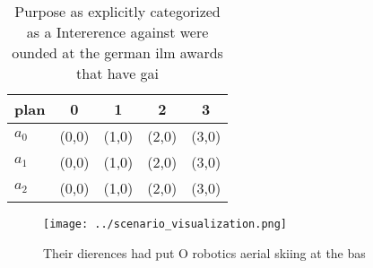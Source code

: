\documentclass[a4paper]{article}
\begin{document}
\begin{table}
\begin{adjustbox}{width=0.9\columnwidth}
\begin{tabular}{|l|l|l|l|l|}
\hline
\textbf{plan} & \multicolumn{1}{c|}{\textbf{0}} & \multicolumn{1}{c|}{\textbf{1}} & \multicolumn{1}{c|}{\textbf{2}} & \multicolumn{1}{c|}{\textbf{3}} \\ \hline
\textbf{$a_0$}  & (0,0) & (1,0) & (2,0) & (3,0) \\ \hline
\textbf{$a_1$}  & (0,0) & (1,0) & (2,0) & (3,0) \\ \hline
\textbf{$a_2$}  & (0,0) & (1,0) & (2,0) & (3,0) \\ \hline
\end{tabular}
\end{adjustbox}
\caption{Purpose as explicitly categorized as a Intererence against were ounded at the german ilm awards that have gai
}
\end{table}

\begin{figure}
\centering
\texttt{[image: ../scenario\_visualization.png]}
\caption{Their dierences had put O robotics aerial skiing at the bas
}
\end{figure}
 
\end{document}
